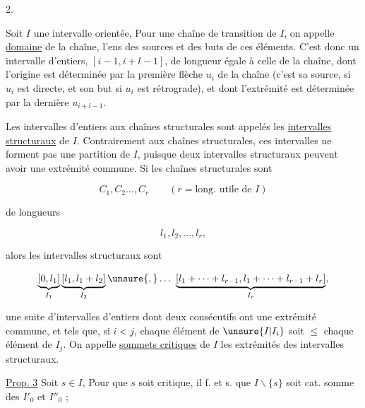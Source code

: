 
2.  

Soit $I$ une  intervalle orientée,  Pour une chaîne    de transition de $I$, on appelle \uline{domaine} de la chaîne, l'ens des sources et des buts de ces éléments. C'est donc un intervalle d'entiers, $[i-1,i+l-1]$, de longueur  égale à celle de la chaîne, dont l'origine est déterminée par la première flèche $u_i$ de la chaîne (c'est sa source, si $u_i$ est directe, et son but si $u_i$ est rétrograde), et dont l'extrémité est déterminée par la dernière $u_{i+l-1}$.

Les intervalles d'entiers   aux chaînes structurales sont appelés les \uline{intervalles structuraux}  de $I$. Contrairement aux chaînes structurales, ces intervalles ne forment pas une partition de $I$, puisque deux intervalles structuraux peuvent avoir une extrémité commune. Si les chaînes structurales sont

\[C_1,C_2\ldots,C_r\qquad (r=\text{long. utile de }I)\]

de longueurs

\[l_1,l_2,\ldots,l_r,\]

alors les intervalles structuraux sont

\[\underbrace{[0,l_1]}_{I_1}\underbrace{[l_1,l_1+l_2]}_{I_2}\unsure{,}\ldots\ \underbrace{[l_1+\cdots+l_{r-1},l_1+\cdots+l_{r-1}+l_r]}_{I_r},\]

une suite d'intervalles d'entiers dont deux consécutifs ont une extrémité commune, et tels que, si $i<j$, chaque élément de $\unsure{I|I_i}$ soit $\leq$ chaque élément de $I_j$. On appelle \uline{sommets critiques} de $I$ les extrémités des intervalles structuraux.

\uline{Prop. 3} Soit $s\in I$,    Pour que $s$ soit critique, il f. et s. que $I\backslash\{s\}$ soit cat. somme des $I'_0$ et $I''_0$ ; 


